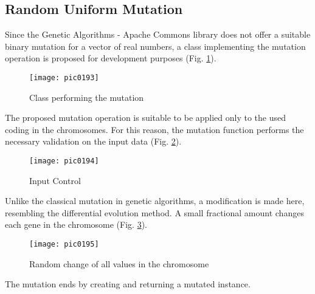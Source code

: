 \subsection{Random Uniform Mutation}

Since the Genetic Algorithms - Apache Commons library does not offer a suitable binary mutation for a vector of real numbers, a class implementing the mutation operation is proposed for development purposes (Fig. \ref{fig:pic0193}).

\begin{figure}[h]
\centering
\texttt{[image: pic0193]}
\caption{Class performing the mutation}
\label{fig:pic0193}
\end{figure}
\FloatBarrier

The proposed mutation operation is suitable to be applied only to the used coding in the chromosomes. For this reason, the mutation function performs the necessary validation on the input data (Fig. \ref{fig:pic0194}).

\begin{figure}[h]
\centering
\texttt{[image: pic0194]}
\caption{Input Control}
\label{fig:pic0194}
\end{figure}
\FloatBarrier

Unlike the classical mutation in genetic algorithms, a modification is made here, resembling the differential evolution method. A small fractional amount changes each gene in the chromosome (Fig. \ref{fig:pic0195}).

\begin{figure}[h]
\centering
\texttt{[image: pic0195]}
\caption{Random change of all values in the chromosome}
\label{fig:pic0195}
\end{figure}
\FloatBarrier

The mutation ends by creating and returning a mutated instance.
